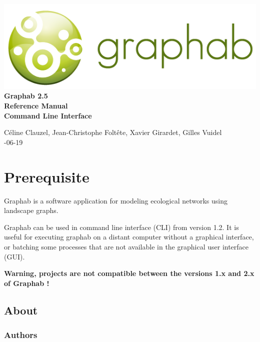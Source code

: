 \documentclass[a4paper,10pt]{report}
\begin{document}
\begin{titlepage}
	
	\centering
	\includegraphics[scale=0.5]{img/logo.png}\\
	
	\bigskip
	\bigskip
	\bigskip	
	{\Huge
		\bfseries
		Graphab 2.5\\
		\bigskip
		Reference Manual\\
		Command Line Interface\\
	}
	\bigskip
	\bigskip
	\bigskip
	\bigskip
	\bigskip
	
	{\Large		
		Céline Clauzel, Jean-Christophe Foltête, Xavier Girardet, Gilles Vuidel\\
		-06-19\\
	}
	
\end{titlepage}

\tableofcontents

\chapter{Prerequisite}
Graphab is a software application for modeling ecological networks using landscape graphs.

Graphab can be used in command line interface (CLI) from version 1.2.
It is useful for executing graphab on a distant computer without a graphical interface, or batching some processes that are not available in the graphical user interface (GUI).

\textbf{Warning, projects are not compatible between the versions 1.x and 2.x of Graphab !}

\section{About}

\subsection{Authors}
\end{document}
